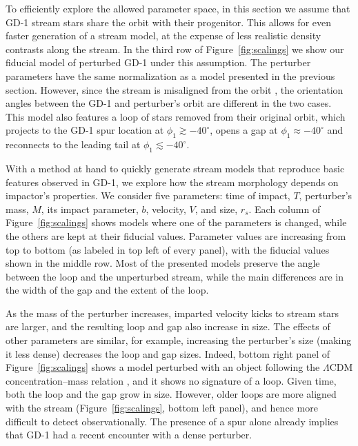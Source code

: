 \documentclass[twocolumn]{aastex62}
\begin{document}
To efficiently explore the allowed parameter space, in this section we assume that GD-1 stream stars share the orbit with their progenitor.
This allows for even faster generation of a stream model, at the expense of less realistic density contrasts along the stream.
In the third row of Figure~\ref{fig:scalings} we show our fiducial model of perturbed GD-1 under this assumption.
The perturber parameters have the same normalization as a model presented in the previous section.
However, since the stream is misaligned from the orbit \citep{sb2013}, the orientation angles between the GD-1 and perturber's orbit are different in the two cases.
This model also features a loop of stars removed from their original orbit, which projects to the GD-1 spur location at $\phi_1\gtrsim-40^\circ$, opens a gap at $\phi_1\approx-40^\circ$ and reconnects to the leading tail at $\phi_1\lesssim-40^\circ$.

With a method at hand to quickly generate stream models that reproduce basic features observed in GD-1, we explore how the stream morphology depends on impactor's properties.
We consider five parameters: time of impact, $T$, perturber's mass, $M$, its impact parameter, $b$, velocity, $V$, and size, $r_s$.
Each column of Figure~\ref{fig:scalings} shows models where one of the parameters is changed, while the others are kept at their fiducial values.
Parameter values are increasing from top to bottom (as labeled in top left of every panel), with the fiducial values shown in the middle row.
Most of the presented models preserve the angle between the loop and the unperturbed stream, while the main differences are in the width of the gap and the extent of the loop.

As the mass of the perturber increases, imparted velocity kicks to stream stars are larger, and the resulting loop and gap also increase in size.
The effects of other parameters are similar, for example, increasing the perturber's size (making it less dense) decreases the loop and gap sizes.
Indeed, bottom right panel of Figure~\ref{fig:scalings} shows a model perturbed with an object following the $\Lambda$CDM concentration--mass relation \citep{diemer2018}, and it shows no signature of a loop.
Given time, both the loop and the gap grow in size.
However, older loops are more aligned with the stream (Figure~\ref{fig:scalings}, bottom left panel), and hence more difficult to detect observationally.
The presence of a spur alone already implies that GD-1 had a recent encounter with a dense perturber.
\end{document}

